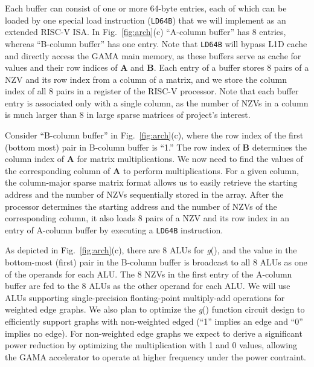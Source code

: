 Each buffer can consist of one or more 64-byte entries, each of which can be loaded by one special load instruction (\texttt{LD64B}) that we will implement as an extended RISC-V ISA. 
In Fig.~\ref{fig:arch}(c) ``A-column buffer'' has 8 entries, whereas ``B-column buffer'' has one entry.
Note that \texttt{LD64B} will bypass L1D cache and directly access the GAMA main memory, as these buffers serve as cache for values and their row indices of \textbf{A} and \textbf{B}.
Each entry of a buffer stores 8 pairs of a NZV and its row index from a column of a matrix, and
we store the column index of all 8 pairs in a register of the RISC-V processor.
Note that each buffer entry is associated only with a single column, 
as the number of NZVs in a column is much larger than 8 in large sparse matrices of project's interest. 


Consider ``B-column buffer'' in Fig.~\ref{fig:arch}(c), where
the row index of the first (bottom most) pair in B-column buffer is ``1.''
The row index of \textbf{B} determines the column index of \textbf{A} for matrix multiplications. %
We now need to find the values of the corresponding column of \textbf{A} to perform multiplications.  
For a given column, the column-major sparse matrix format allows us to easily retrieve 
the starting address and the number of NZVs sequentially stored in the array. 
After the processor determines the starting address and the number of NZVs of the corresponding column, 
it also loads 8 pairs of a NZV and its row index in an entry of A-column buffer by executing a \texttt{LD64B} instruction.


As depicted in Fig.~\ref{fig:arch}(c), there are 8 ALUs for \textit{g}(), and the value in the bottom-most (first) pair in the B-column buffer 
is broadcast to all 8 ALUs as one of the operands for each ALU.
The 8 NZVs in the first entry of the A-column buffer are fed to the 8 ALUs as the other operand for each ALU.
We will use ALUs supporting single-precision floating-point multiply-add operations for weighted edge graphs. 
We also plan to optimize the \textit{g}() function circuit design to efficiently support graphs with non-weighted edged (``1'' implies an edge and ``0'' implies no edge). 
For non-weighted edge graphs we expect to derive a significant power reduction by optimizing the multiplication with 1 and 0 values, 
allowing the GAMA accelerator to operate at higher frequency under the power contraint.     
 

